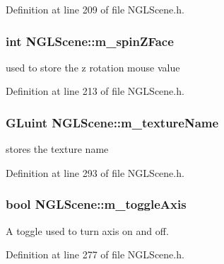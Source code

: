 Definition at line 209 of file N\-G\-L\-Scene.\-h.

\subsubsection[{m\-\_\-spin\-Z\-Face}]{\setlength{\rightskip}{0pt plus 5cm}int N\-G\-L\-Scene\-::m\-\_\-spin\-Z\-Face\hspace{0.3cm}{\ttfamily [private]}}\label{class_n_g_l_scene_a5d4b48f3cb86d13383da46506e3181ca}


used to store the z rotation mouse value 



Definition at line 213 of file N\-G\-L\-Scene.\-h.

\subsubsection[{m\-\_\-texture\-Name}]{\setlength{\rightskip}{0pt plus 5cm}G\-Luint N\-G\-L\-Scene\-::m\-\_\-texture\-Name\hspace{0.3cm}{\ttfamily [private]}}\label{class_n_g_l_scene_ae06af2529f536464173b6f50aa546f28}


stores the texture name 



Definition at line 293 of file N\-G\-L\-Scene.\-h.

\subsubsection[{m\-\_\-toggle\-Axis}]{\setlength{\rightskip}{0pt plus 5cm}bool N\-G\-L\-Scene\-::m\-\_\-toggle\-Axis\hspace{0.3cm}{\ttfamily [private]}}\label{class_n_g_l_scene_a26a414b533b258de1770678af6998782}


A toggle used to turn axis on and off. 



Definition at line 277 of file N\-G\-L\-Scene.\-h.

